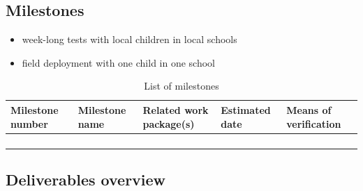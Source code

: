 \documentclass[11pt,a4paper]{report}
\begin{document}
\subsection{Milestones}\label{milestones}

\begin{itemize}

\item   week-long tests with local children in local schools
\item   field deployment with one child in one school
\end{itemize}

\begin{table}[!htbp]
\caption{List of milestones}
\centering
\begin{tabular}{@{}lllll@{}}
\toprule
\textbf{Milestone number} & \textbf{Milestone name} & \textbf{Related work package(s)} & \textbf{Estimated date} & \textbf{Means of verification} \\ \midrule
                          &                         &                                  &                         &                                \\
                          &                         &                                  &                         &                                \\
                          &                         &                                  &                         &                                \\
                          &                         &                                  &                         &                                \\ \bottomrule
\end{tabular}
\end{table}


\subsection{Deliverables overview}\label{deliverables-overview}
\end{document}
